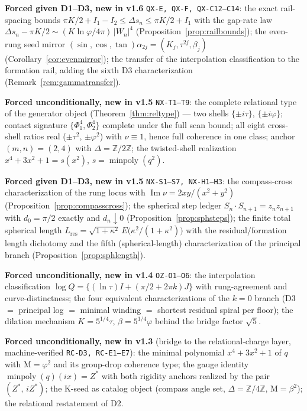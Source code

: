 \documentclass[11pt]{article}
\newcommand{\hx}[1]{\textcolor{cC}{\footnotesize\texttt{#1}}}
\newcommand{\Z}{\mathbb{Z}}
\newcommand{\gp}{\varphi}
\newcommand{\M}{\mathrm{M}}
\theoremstyle{plain}
\theoremstyle{definition}
\theoremstyle{remark}
\begin{document}
\smallskip\noindent
\textbf{Forced given D1--D3, new in v1.6} \hx{QX-E, QX-F, QX-C12--C14}:
the exact rail-spacing bounds
$\pi K/2+I_1-I_2\le\Delta s_n\le\pi K/2+I_1$ with the gap-rate law
$\Delta s_n-\pi K/2\sim(K\ln\gp/4\pi)\,|W_n|^4$
(Proposition~\ref{prop:railbounds}); the even-rung seed mirror
$(\sin,\cos,\tan)\alpha_{2j}=(K_j,\tau^{2j},\beta_j)$
(Corollary~\ref{cor:evenmirror}); the transfer of the interpolation
classification to the formation rail, adding the sixth D3 characterization
(Remark~\ref{rem:gammatransfer}).

\smallskip\noindent
\textbf{Forced unconditionally, new in v1.5} \hx{NX-T1--T9}: the complete
relational type of the generator object (Theorem~\ref{thm:reltype}) --- two
shells $\{\pm i\tau\}$, $\{\pm i\gp\}$; contact signature
$\{\Phi_1^{4},\Phi_2^{4}\}$ complete under the full scan bound; all eight
cross-shell ratios real ($\pm\tau^2$, $\pm\gp^2$) with $\nu\equiv1$,
hence full coherence in one class; anchor $(m,n)=(2,4)$ with
$\Delta=\Z/2\Z$; the twisted-shell realization $x^4+3x^2+1=s(x^2)$,
$s=\operatorname{minpoly}(q^2)$.

\smallskip\noindent
\textbf{Forced given D1--D3, new in v1.5} \hx{NX-S1--S7, NX-H1--H3}: the
compass-cross characterization of the rung locus with
$\operatorname{Im}\nu=2xy/(x^2+y^2)$
(Proposition~\ref{prop:compasscross}); the spherical step ledger
$S_n\cdot S_{n+1}=z_nz_{n+1}$ with $d_0=\pi/2$ exactly and
$d_n\downarrow0$ (Proposition~\ref{prop:sphsteps}); the finite total
spherical length
$L_{\mathrm{res}}=\sqrt{1+\kappa^2}\,E\bigl(\kappa^2/(1+\kappa^2)\bigr)$
with the residual/formation length dichotomy and the fifth
(spherical-length) characterization of the principal branch
(Proposition~\ref{prop:sphlength}).

\smallskip\noindent
\textbf{Forced unconditionally, new in v1.4} \hx{OZ-O1--O6}: the
interpolation classification $\log Q=\{(\ln\tau)I+(\pi/2+2\pi k)J\}$ with
rung-agreement and curve-distinctness; the four equivalent characterizations
of the $k=0$ branch (D3 $=$ principal log $=$ minimal winding $=$ shortest
residual spiral per floor); the dilation mechanism $K=5^{1/4}\tau$,
$\beta=5^{1/4}\gp$ behind the bridge factor $\sqrt5$.

\smallskip\noindent
\textbf{Forced unconditionally, new in v1.3} (bridge to the relational-charge
layer, machine-verified \hx{RC-D3, RC-E1--E7}): the minimal polynomial
$x^4+3x^2+1$ of $q$ with $\M=\gp^2$ and its group-drop coherence type; the
gauge identity $\operatorname{minpoly}(q)(ix)=Z^{*}$ with both rigidity
anchors realized by the pair $(Z^{*},\,iZ^{*})$; the K-seed as catalog object
(compass angle set, $\Delta=\Z/4\Z$, $\M=\beta^2$); the relational
restatement of D2.
\end{document}
